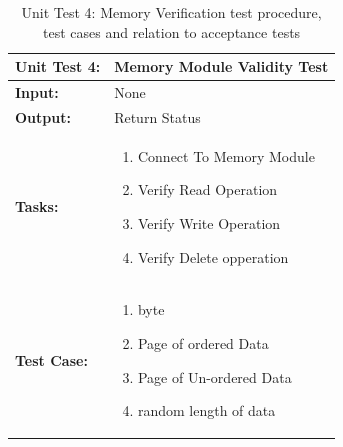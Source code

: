 \begin{table}[H]
    \centering
    \caption{Unit Test 4: Memory Verification test procedure, test cases and relation to acceptance tests}
    \begin{tabular}{|m{}|m{}|}
    \hline
       \textbf{Unit Test 4: }  &  Memory Module Validity Test\\
       \hline
        \textbf{Input: } &  None\\
        \hline
        \textbf{Output: } & Return Status\\
        \hline
        \textbf{Tasks: } & \begin{enumerate}
        \vspace{1mm}
            \item Connect To Memory Module
            \item Verify Read Operation
            \item Verify Write Operation
            \item Verify Delete opperation
            
        \end{enumerate}\\
        \hline
        \textbf{Test Case: } & \begin{enumerate}
            \vspace{1mm}
            \item byte
            \item Page of ordered Data
            \item Page of Un-ordered Data
            \item random length of data
        \end{enumerate}\\
        \hline
    \end{tabular}

    \label{tab:UT004}
\end{table}

